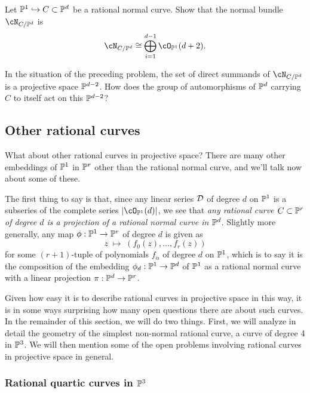 \begin{exercise}
Let $\PP^1 \hookrightarrow C \subset \PP^d$ be a rational normal curve. Show that the normal bundle $\cN_{C/\PP^d}$  is 
$$
\cN_{C/\PP^d} \cong \bigoplus_{i=1}^{d-1} \cO_{\PP^1}(d+2).
$$
\end{exercise}

\begin{exercise}
In the situation of the preceding problem, the set  of direct summands of $\cN_{C/\PP^d} $ is a projective space $\PP^{d-2}$. How does the  group of automorphisms of $\PP^d$ carrying $C$ to itself act on this $\PP^{d-2}$?

\end{exercise}

\subsection{Other rational curves}

What about other rational curves in projective space? There are many other embeddings of $\PP^1$ in $\PP^r$ other than the rational normal curve, and we'll talk now about some of these.

The first thing to say is that, since any linear series $\cD$ of degree $d$ on $\PP^1$ is a subseries of the complete series $|\cO_{\PP^1}(d)|$, we see that \emph{any rational curve $C \subset \PP^r$ of degree $d$ is a projection of a rational normal curve in $\PP^d$}. Slightly more generally, any map $\phi : \PP^1 \to \PP^r$ of degree $d$ is given as
$$
z \; \mapsto \; (f_0(z), \dots, f_r(z))
$$
for some $(r+1)$-tuple of polynomials $f_\alpha$ of degree $d$ on $\PP^1$, which is to say it is the composition of the embedding $\phi_d : \PP^1 \to \PP^d$ of $\PP^1$ as a rational normal curve with a linear projection $\pi : \PP^d \to \PP^r$. 

Given how easy it is to describe rational curves in projective space in this way, it is in some ways surprising how many open questions there are about such curves. In the remainder of this section, we will do two things. First, we will analyze in detail the geometry of the simplest non-normal rational curve, a curve of degree 4 in $\PP^3$. We will then mention some of the open problems involving rational curves in projective space in general.

\subsubsection{Rational quartic curves in $\PP^3$}

